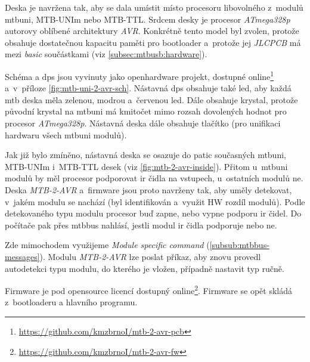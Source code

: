 Deska je navržena tak, aby se dala umístit místo procesoru libovolného z~modulů
\gls{mtbuni}, MTB-UNIm nebo MTB-TTL. Srdcem desky je procesor
\textit{ATmega328p} autorovy oblíbené architektury \textit{AVR}.
Konkrétně tento model byl zvolen, protože obsahuje dostatečnou kapacitu paměti
pro bootloader a~protože jej \textit{JLCPCB} má mezi \textit{basic} součástkami
(viz \ref{subsec:mtbusb:hardware}).

Schéma a \gls{dps} jsou vyvinuty jako openhardware projekt, dostupné
online\footnote{\url{https://github.com/kmzbrnoI/mtb-2-avr-pcb}} a~v~příloze
\ref{fig:mtb-uni-2-avr-sch}. Nástavná \gls{dps} obsahuje také \gls{led}, aby každá
\gls{mtb} deska měla zelenou, modrou a~červenou \gls{led}. Dále obsahuje krystal,
protože původní krystal na \gls{mtbuni} má kmitočet mimo rozsah dovolených
hodnot pro procesor \textit{ATmega328p}. Nástavná deska dále
obsahuje tlačítko (pro unifikaci hardwaru všech \gls{mtbuni} modulů).

Jak již bylo zmíněno, nástavná deska se osazuje do patic současných
\gls{mtbuni}, MTB-UNIm i~MTB-TTL desek (viz \ref{fig:mtb-2-avr-inside}).
Přitom u~\gls{mtbuni} modulů by měl
procesor podporovat \gls{ir} čidla na vstupech, u~ostatních modulů ne. Deska \textit{MTB-2-AVR}
a~firmware jsou proto navrženy tak, aby uměly detekovat, v~jakém modulu se
nachází (byl identifikován a~využit HW rozdíl modulů). Podle detekovaného typu
modulu procesor buď zapne, nebo vypne podporu \gls{ir} čidel. Do počítače pak přes
\gls{mtbbus} nahlásí, jestli modul \gls{ir} čidla podporuje nebo ne.

Zde mimochodem využijeme \textit{Module specific command}
(\ref{subsub:mtbbus-messages}). Modulu \textit{MTB-2-AVR} lze poslat příkaz,
aby znovu provedl autodetekci typu modulu, do kterého je vložen, případně
nastavit typ ručně.

Firmware je pod opensource licencí dostupný
online\footnote{\url{https://github.com/kmzbrnoI/mtb-2-avr-fw}}.
Firmware se opět skládá z~bootloaderu a hlavního programu.
